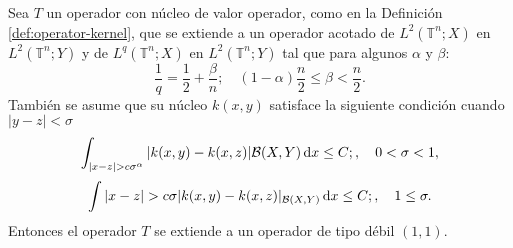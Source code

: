 \begin{theorem}
	Sea $T$ un operador con núcleo de valor operador, como en la Definición \ref{def:operator-kernel}, que se extiende a un operador acotado de $L^2(\mathbb{T}^n; X)$ en $L^2(\mathbb{T}^n; Y)$ y de $L^q(\mathbb{T}^n; X)$ en $L^2(\mathbb{T}^n; Y)$ tal que para algunos $\alpha$ y $\beta$:
	\begin{equation}
		\frac{1}{q} = \frac{1}{2} + \frac{\beta}{n} ; \quad (1-\alpha)\frac{n}{2} \leq \beta < \frac{n}{2}.
		\label{eq:alpha_condition}
	\end{equation}
	También se asume que su núcleo $k(x, y)$ satisface la siguiente condición cuando $|y-z|<\sigma$
	\begin{equation}
		\int_{|x-z|>c\sigma^\alpha}|k(x, y)-k(x,z)|{\mathcal{B}(X, Y)}\diff x\leq C ;, \quad 0<\sigma < 1,
		\label{eq:hyp-sigma<1}
	\end{equation}
	\begin{equation}
		\int{|x-z|>c\sigma}|k(x, y)-k(x,z)|_{\mathcal{B}(X, Y)}\diff x \leq C ;, \quad 1 \leq \sigma.
		\label{eq:hyp-sgima>1}
	\end{equation}
	Entonces el operador $T$ se extiende a un operador de tipo débil $(1,1)$.
	\label{theo:L1-weak}
\end{theorem}
